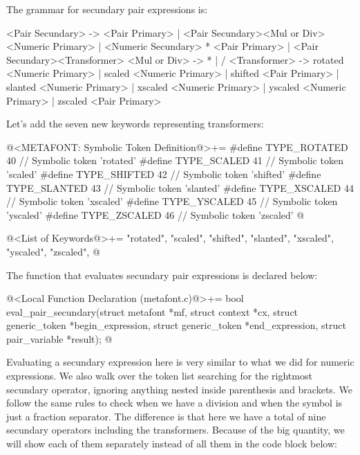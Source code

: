 
The grammar for secundary pair expressions is:

\alinhaverbatim
<Pair Secundary> -> <Pair Primary> |
                    <Pair Secundary><Mul or Div><Numeric Primary> |
                    <Numeric Secundary> * <Pair Primary> |
                    <Pair Secundary><Transformer>
<Mul or Div> -> * | /
<Transformer> -> rotated <Numeric Primary> |
                 scaled <Numeric Primary> |
                 shifted <Pair Primary> |
                 slanted <Numeric Primary> |
                 xscaled <Numeric Primary> |
                 yscaled <Numeric Primary> |
                 zscaled <Pair Primary>
\alinhanormal

Let's add the seven new keywords representing transformers:

\iniciocodigo
@<METAFONT: Symbolic Token Definition@>+=
#define TYPE_ROTATED  40 // Symbolic token 'rotated'
#define TYPE_SCALED   41 // Symbolic token 'scaled'
#define TYPE_SHIFTED  42 // Symbolic token 'shifted'
#define TYPE_SLANTED  43 // Symbolic token 'slanted'
#define TYPE_XSCALED  44 // Symbolic token 'xscaled'
#define TYPE_YSCALED  45 // Symbolic token 'yscaled'
#define TYPE_ZSCALED  46 // Symbolic token 'zscaled'
@
\fimcodigo

\iniciocodigo
@<List of Keywords@>+=
"rotated", "scaled", "shifted", "slanted", "xscaled", "yscaled",
"zscaled",
@
\fimcodigo


The function that evaluates secundary pair expressions is declared
below:

\iniciocodigo
@<Local Function Declaration (metafont.c)@>+=
bool eval_pair_secundary(struct metafont *mf, struct context *cx,
                         struct generic_token *begin_expression,
                         struct generic_token *end_expression,
                         struct pair_variable *result);
@
\fimcodigo

Evaluating a secundary expression here is very similar to what we did
for numeric expressions. We also walk over the token list searching
for the rightmost secundary operator, ignoring anything nested inside
parenthesis and brackets. We follow the same rules to check when we
have a division and when the symbol \monoespaco{/} is just a fraction
separator. The difference is that here we have a total of nine
secundary operators including the transformers. Because of the big
quantity, we will show each of them separately instead of all them in
the code block below:

